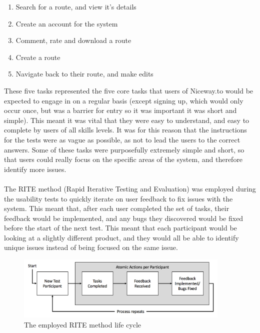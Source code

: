 \begin{enumerate}
	\item Search for a route, and view it's details
	\item Create an account for the system
	\item Comment, rate and download a route 
	\item Create a route
	\item Navigate back to their route, and make edits
\end{enumerate}
\noindent 
These five tasks represented the five core tasks that users of Niceway.to would be expected to engage in on a regular basis (except signing up, which would only occur once, but was a barrier for entry so it was important it was short and simple). This meant it was vital that they were easy to understand, and easy to complete by users of all skills levels. It was for this reason that the instructions for the tests were as vague as possible, as not to lead the users to the correct answers. Some of these tasks were purposefully extremely simple and short, so that users could really focus on the specific areas of the system, and therefore identify more issues.\ \\
\ \\
The RITE method (Rapid Iterative Testing and Evaluation) was employed during the usability tests to quickly iterate on user feedback to fix issues with the system. This meant that, after each user completed the set of tasks, their feedback would be implemented, and any bugs they discovered would be fixed before the start of the next test. This meant that each participant would be looking at a slightly different product, and they would all be able to identify unique issues instead of being focused on the same issue.

\begin{figure}[!ht]
	\begin{center}
		\includegraphics[width=0.9125\textwidth]{images/testing/rite.png}
	\end{center}
	\vspace{-6mm}
	\caption{The employed RITE method life cycle}	
	\vspace{-6mm}
\end{figure}

